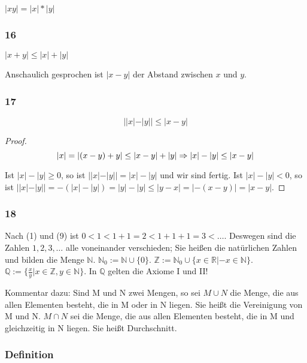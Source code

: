 \documentclass[a4paper,10pt]{article}
\begin{document}
$|xy| = |x| * |y|$

\subsubsection{16}

$|x + y| \le |x| + |y|$

Anschaulich gesprochen ist $|x - y|$ der Abstand zwischen $x$ und $y$.

\subsubsection{17}

\begin{equation}
 ||x| - |y|| \le |x - y|
\end{equation}

\begin{proof}
 \begin{equation}
  |x| = |(x - y) + y| \le |x - y| + |y|\\
  \Rightarrow |x| - |y| \le |x - y|\\
 \end{equation}
 
 Ist $|x| - |y| \ge 0$, so ist $||x| - |y|| = |x| - |y|$ und wir sind fertig.
 Ist $|x| - |y| < 0$, so ist $||x| - |y|| = -(|x| - |y|) = |y| - |y| \le |y - x| = |-(x - y)| = |x - y|$.
\end{proof}

\subsubsection{18}

Nach (1) und (9) ist $0 < 1 < 1 + 1 = 2 < 1 + 1 + 1 = 3 < \dots$.
Deswegen sind die Zahlen $1, 2, 3, \dots$ alle voneinander verschieden; Sie heißen die natürlichen Zahlen und bilden die Menge $\mathbb{N}$.
$\mathbb{N}_0 := \mathbb{N} \cup \{0\}$.
$\mathbb{Z} := \mathbb{N}_0 \cup \{x \in \mathbb{R} | -x \in \mathbb{N}\}$.
$\mathbb{Q} := \{\frac{x}{y} | x \in \mathbb{Z}, y \in \mathbb{N} \}$.
In $\mathbb{Q}$ gelten die Axiome I und II!

Kommentar dazu: Sind M und N zwei Mengen, so sei $M \cup N$ die Menge, die aus allen Elementen besteht, die in M oder in N liegen.
Sie heißt die Vereinigung von M und N.
$M \cap N$ sei die Menge, die aus allen Elementen besteht, die in M und gleichzeitig in N liegen.
Sie heißt Durchschnitt.

\subsubsection{Definition}
\end{document}
